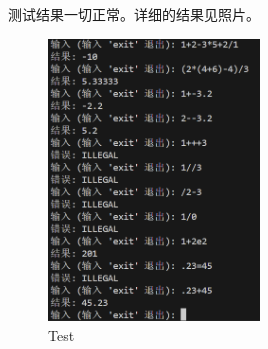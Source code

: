 \documentclass[UTF8]{ctexart}
\begin{document}
测试结果一切正常。详细的结果见照片。\\

\begin{figure}[h]
    \centering
    \includegraphics[width=0.5\textwidth]{./test.png}
    \caption{Test}
    \label{fig:photo}
\end{figure}
\end{document}
